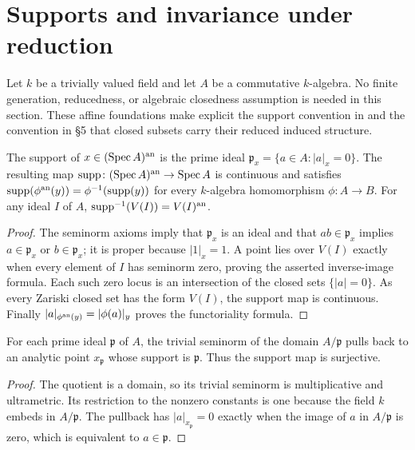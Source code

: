 \section{Supports and invariance under reduction}\label{sec:berkovich-reduction}

Let $k$ be a trivially valued field and let $A$ be a commutative $k$-algebra.
No finite generation, reducedness, or algebraic closedness assumption is needed in this section.
These affine foundations make explicit the support convention in \cite[\S2.1]{FHX} and the
convention in \S5 that closed subsets carry their reduced induced structure.

\begin{definition}\label{berk:support}
\leanok
{}
The support of $x\in(\operatorname{Spec} A)^{\mathrm{an}}$ is the prime ideal
$\mathfrak p_x=\{a\in A:|a|_x=0\}$. The resulting map
$\operatorname{supp}\colon(\operatorname{Spec} A)^{\mathrm{an}}\to\operatorname{Spec} A$ is continuous and satisfies
$\operatorname{supp}(\phi^{\mathrm{an}}(y))=\phi^{-1}(\operatorname{supp}(y))$ for every
$k$-algebra homomorphism $\phi\colon A\to B$. For any ideal $I$ of $A$,
$\operatorname{supp}^{-1}(V(I))=V(I)^{\mathrm{an}}$.
\end{definition}
\begin{proof}
The seminorm axioms imply that $\mathfrak p_x$ is an ideal and that
$ab\in\mathfrak p_x$ implies $a\in\mathfrak p_x$ or $b\in\mathfrak p_x$;
it is proper because $|1|_x=1$. A point lies over $V(I)$ exactly when every
element of $I$ has seminorm zero, proving the asserted inverse-image formula.
Each such zero locus is an intersection of the closed sets $\{|a|=0\}$.
As every Zariski closed set has the form $V(I)$, the support map is continuous.
Finally $|a|_{\phi^{\mathrm{an}}(y)}=|\phi(a)|_y$ proves the functoriality formula.
\end{proof}

\begin{lemma}\label{berk:support-surjective}
\leanok
{}
For each prime ideal $\mathfrak p$ of $A$, the trivial seminorm of the domain
$A/\mathfrak p$ pulls back to an analytic point $x_{\mathfrak p}$ whose support
is $\mathfrak p$. Thus the support map is surjective.
\end{lemma}
\begin{proof}
The quotient is a domain, so its trivial seminorm is multiplicative and ultrametric.
Its restriction to the nonzero constants is one because the field $k$ embeds in
$A/\mathfrak p$. The pullback has $|a|_{x_{\mathfrak p}}=0$ exactly when
the image of $a$ in $A/\mathfrak p$ is zero, which is equivalent to $a\in\mathfrak p$.
\end{proof}

